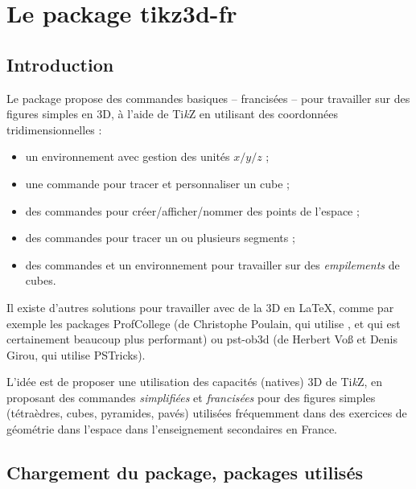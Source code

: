 \documentclass[french,a4paper,11pt]{article}
\providecommand\tikzlogo{Ti\textit{k}Z}
\providecommand\PSTricks{\textsf{PSTricks}\xspace}
\let\pstricks\PSTricks
\let\TikZ\tikzlogo
\begin{document}
\section{Le package tikz3d-fr}

\subsection{Introduction}

\begin{noteblock}
Le package propose des commandes basiques -- francisées -- pour travailler sur des figures simples en 3D, à l'aide de \TikZ{} en utilisant des coordonnées tridimensionnelles :

\begin{itemize}
	\item un environnement avec gestion des unités $x/y/z$ ;
	\item une commande pour tracer et personnaliser un cube ;
	\item des commandes pour créer/afficher/nommer des points de l'espace ;
	\item des commandes pour tracer un ou plusieurs segments ;
	\item des commandes et un environnement pour travailler sur des \textit{empilements} de cubes.
\end{itemize}
\vspace*{-\baselineskip}\leavevmode
\end{noteblock}

\begin{importantblock}
Il existe d'autres solutions pour travailler avec de la 3D en \LaTeX, comme par exemple les packages \textsf{ProfCollege}\footnotemark{} (de Christophe Poulain, qui utilise , et qui est certainement beaucoup plus performant) ou \textsf{pst-ob3d}\footnotemark{} (de Herbert Voß et Denis Girou, qui utilise \pstricks).

\smallskip

L'idée est de proposer une utilisation des capacités (natives) 3D de \TikZ, en proposant des commandes \textit{simplifiées} et \textit{francisées} pour des figures simples (tétraèdres, cubes, pyramides, pavés) utilisées fréquemment dans des exercices de géométrie dans l'espace dans l'enseignement secondaires en France.
\end{importantblock}

\subsection{Chargement du package, packages utilisés}
\end{document}
